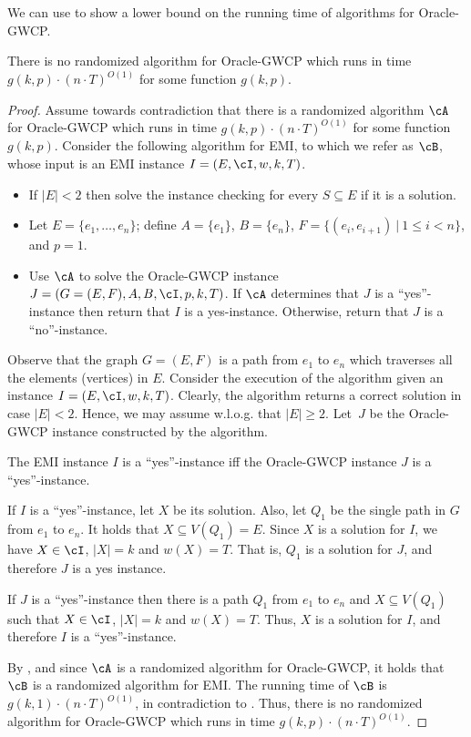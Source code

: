 We can use  to show a lower bound on the running time of algorithms for  Oracle-GWCP. 
\begin{lemma}
There is no randomized algorithm for \textnormal{Oracle-GWCP}  which runs in time $g(k,p)\cdot (n\cdot T)^{O(1)}$ for some function $g(k,p)$.
\end{lemma}
\begin{proof}
Assume towards contradiction that there is a randomized algorithm  $\cA$ for Oracle-GWCP   which runs in time $g(k,p)\cdot (n\cdot T)^{O(1)}$ for some function $g(k,p)$.  Consider the following algorithm for EMI, to which we refer as $\cB$, whose input is an EMI instance $I=(E,\cI,w,k,T)$.
\begin{itemize}
	\item If $|E|<2$ then solve the instance checking for every $S\subseteq E$ if it is a solution.
	\item   Let $E=\{e_1,\ldots, e_n\}$;  define $A=\{e_1\}$, $B=\{e_n\}$, $F=\{ (e_i,e_{i+1})~|~1\leq i<n\}$, and $p=1$. 
	\item  Use $\cA$ to solve the Oracle-GWCP instance $J=(G=(E,F),A,B,\cI, p,k,T)$. If $\cA$ determines  that $J$ is a ``yes''-instance then return that $I$ is a yes-instance. Otherwise, return that $J$ is a ``no''-instance. 
\end{itemize}
Observe that the graph $G=(E,F)$ is a path from $e_1$ to $e_n$ which traverses all the elements (vertices) in $E$. 
Consider the execution of the algorithm given an instance $I=(E,\cI,w,k,T)$. Clearly, the algorithm returns a correct solution in case $|E| <2$. Hence, we may assume w.l.o.g. that $|E|\geq 2$.  Let~$J$ be the Oracle-GWCP instance constructed by the algorithm.

\begin{claim}
	\label{claim:gwcp}
	The \textnormal{EMI} instance $I$  is a ``yes''-instance iff  the \textnormal{Oracle-GWCP} instance $J$ is a ``yes''-instance.
\end{claim}
\begin{claimproof}
	If $I$ is a ``yes''-instance, let $X$ be its solution. Also, let $Q_1$ be the single path in $G$ from $e_1$ to $e_n$. It holds that  $X\subseteq V(Q_1)=E$. Since $X$ is a solution for $I$, we have $X\in \cI$, $|X|=k$ and $w(X)=T$. That is, $Q_1$ is a solution for $J$, and therefore $J$ is a yes instance.
	
	If $J$ is a ``yes''-instance then there is a path $Q_1$ from $e_1$ to $e_n$ and $X\subseteq V(Q_1)$ such that $X\in \cI$, $|X|=k$ and $w(X)=T$. Thus, $X$ is a solution for $I$, and therefore $I$ is a ``yes''-instance.
\end{claimproof}

By , and since $\cA$ is a randomized algorithm for Oracle-GWCP, it holds that $\cB$ is a randomized algorithm for EMI. The running time of $\cB$ is $g(k,1)\cdot (n\cdot T)^{O(1)}$, in contradiction to . Thus, there is no randomized algorithm for Oracle-GWCP which runs in time $g(k,p)\cdot (n\cdot T)^{O(1)}$. 
	
\end{proof}

